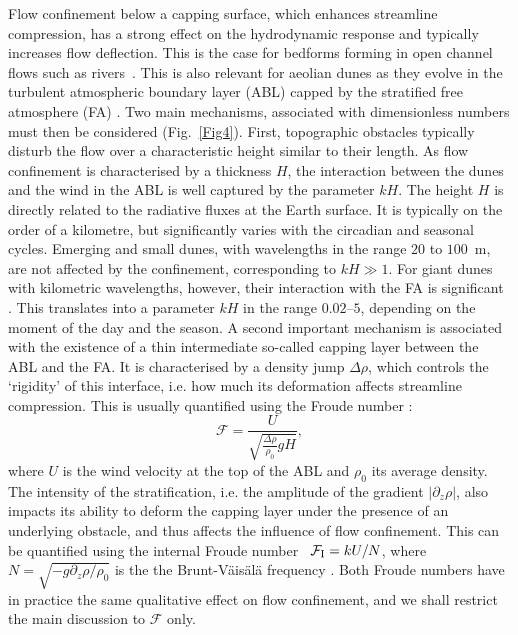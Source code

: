 Flow confinement below a capping surface, which enhances streamline compression, has a strong effect on the hydrodynamic response and typically increases flow deflection. This is the case for bedforms forming in open channel flows such as rivers~\citep{Fourriere2010, Unsworth2018}. This is also relevant for aeolian dunes as they evolve in the turbulent atmospheric boundary layer (ABL) capped by the stratified free atmosphere (FA) \citep{Andreotti2009}. Two main mechanisms, associated with dimensionless numbers must then be considered (Fig.~\ref{Fig4}). First, topographic obstacles typically disturb the flow over a characteristic height similar to their length. As flow confinement is characterised by a thickness $H$, the interaction between the dunes and the wind in the ABL is well captured by the parameter $k H$. The height $H$ is directly related to the radiative fluxes at the Earth surface. It is typically on the order of a kilometre, but significantly varies with the circadian and seasonal cycles. Emerging and small dunes, with wavelengths in the range $20$ to $100$~m, are not affected by the confinement, corresponding to $k H \gg 1$. For giant dunes with kilometric wavelengths, however, their interaction with the FA is significant \citep{Andreotti2009}. This translates into a parameter $kH$ in the range $0.02$--$5$, depending on the moment of the day and the season. A second important mechanism is associated with the existence of a thin intermediate so-called capping layer between the ABL and the FA. It is characterised by a density jump $\Delta\rho$, which controls the `rigidity' of this interface, i.e. how much its deformation affects streamline compression. This is usually quantified using the Froude number \citep{Vosper2004, Stull2006, Sheridan2006, Hunt2006, Jiang2014}:
%
\begin{equation}
\mathcal{F} = \displaystyle\frac{U}{\sqrt{\displaystyle\frac{\Delta\rho}{\rho_{0}}gH}},
\label{FroudeNumber}
\end{equation}
%
where $U$ is the wind velocity at the top of the ABL and $\rho_{0}$ its average density. The intensity of the stratification, i.e. the amplitude of the gradient $\left | \partial_z \rho \right|$, also impacts its ability to deform the capping layer under the presence of an underlying obstacle, and thus affects the influence of flow confinement. This can be quantified using the internal Froude number~\citep{Vosper2004, Stull2006, Sheridan2006, Hunt2006, Jiang2014} $\mathcal{F}_{\textup{I}} = k U/N$, where $N = \sqrt{-g \partial_z \rho / \rho_{0}}$ is the the Brunt-V\"ais\"al\"a frequency \citep{Stull1988}. Both Froude numbers have in practice the same qualitative effect on flow confinement, and we shall restrict the main discussion to $\mathcal{F}$ only.

